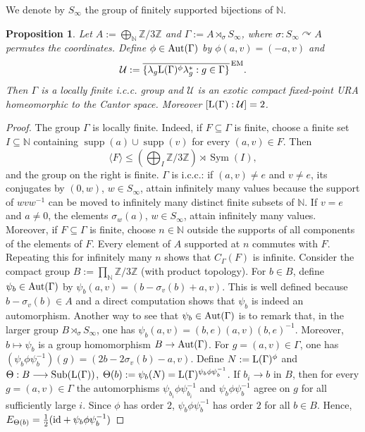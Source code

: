 \documentclass[12pt]{amsart} %
\theoremstyle{plain}
\newtheorem{proposition}[theorem]{Proposition}
\theoremstyle{definition}
\newcommand{\N}{\mathbb{N}}
\newcommand{\Z}{\mathbb{Z}}
\newcommand{\id}{{\rm id}}
\newcommand{\LL}{{\rm L}}
\newcommand{\Aut}{{\rm Aut}}
\DeclareMathOperator{\Sub}{Sub}
\begin{document}
\medskip
\noindent We denote by $S_\infty$ the group of finitely supported bijections of $\N$.
\begin{proposition}\label{prop:fixed-point-non-fg-not-discrete}
Let $A:=\bigoplus_{\N}\Z/3\Z$ and $\Gamma:=A\rtimes_\sigma S_\infty$, where $\sigma:S_\infty\curvearrowright A$ permutes the coordinates. Define
$\phi\in\Aut(\Gamma)$ by $\phi(a,v)=(-a,v)$ and
$$\mathcal U:=\overline{\{\lambda_g\LL(\Gamma)^\phi\lambda_g^*:g\in\Gamma\}}^{\,\mathrm{EM}}.$$
Then $\Gamma$ is a locally finite i.c.c. group and $\mathcal U$ is an exotic compact fixed-point URA
homeomorphic to the Cantor space. Moreover $[\LL(\Gamma):\mathcal U]=2$.
\end{proposition}
\begin{proof}
The group $\Gamma$ is locally finite. Indeed, if
$F\subseteq\Gamma$ is finite, choose a finite set $I\subseteq\N$ containing
$\operatorname{supp}(a)\cup\operatorname{supp}(v)$ for every $(a,v)\in F$.
Then
$$
\langle F\rangle
\leq
\left(\bigoplus_I\Z/3\Z\right)\rtimes\operatorname{Sym}(I),
$$
and the group on the right is finite. $\Gamma$ is i.c.c.: if $(a,v)\neq e$ and $v\neq e$, its
conjugates by $(0,w)$, $w\in S_\infty$, attain infinitely many values because
the support of $wvw^{-1}$ can be moved to infinitely many distinct finite
subsets of $\N$. If $v=e$ and $a\neq0$, the elements $\sigma_w(a)$,
$w\in S_\infty$, attain infinitely many values. Moreover, if
$F\subseteq\Gamma$ is finite, choose $n\in\N$ outside the supports of all
components of the elements of $F$. Every element of $A$ supported at $n$
commutes with $F$. Repeating this for infinitely many $n$ shows that
$C_\Gamma(F)$ is infinite.
\medskip
\noindent Consider the compact group $B:=\prod_{\N}\Z/3\Z$ (with product topology). For $b\in B$, define $\psi_b\in\Aut(\Gamma)$ by $\psi_b(a,v)=(b-\sigma_v(b)+a,v)$. This is well defined because $b-\sigma_v(b)\in A$ and a direct computation shows that $\psi_b$ is indeed an automorphism. Another way to see that $\psi_b\in\Aut(\Gamma)$ is to remark that, in the larger group $B\rtimes_\sigma S_\infty$, one has $\psi_b(a,v)=(b,e)(a,v)(b,e)^{-1}$. Moreover, $b\mapsto\psi_b$ is a group homomorphism $B\to\Aut(\Gamma)$.
\medskip
\noindent For $g=(a,v)\in\Gamma$, one has $(\psi_b\phi\psi_b^{-1})(g)
=
(2b-2\sigma_v(b)-a,v)$. Define $N:=\LL(\Gamma)^\phi$ and  $\Theta:B\longrightarrow\Sub(\LL(\Gamma))$, $\Theta(b):=\psi_b(N)=\LL(\Gamma)^{\psi_b\phi\psi_b^{-1}}$. If $b_i\to b$ in $B$, then for every $g=(a,v)\in\Gamma$ the
automorphisms $\psi_{b_i}\phi\psi_{b_i}^{-1}$ and
$\psi_b\phi\psi_b^{-1}$ agree on $g$ for all sufficiently large $i$. Since $\phi$ has order $2$, $\psi_b\phi\psi_b^{-1}$ has order $2$ for all $b\in B$. Hence, $E_{\Theta(b)}=\frac12(\id+\psi_b\phi\psi_b^{-1})$

\end{proof}
\end{document}
